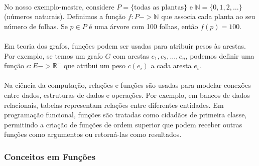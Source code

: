 \documentclass[12pt,a4paper]{article}
\def\to{->}%
\begin{document}
\paragraph{}
No nosso exemplo-mestre, considere \(P=\{\text{todas as plantas}\}\) e \(\mathbb{N}=\{0,1,2,\ldots\}\) (números naturais). Definimos a função \(f: P \to \mathbb{N}\) que associa cada planta ao seu número de folhas. Se \(p \in P\) é uma árvore com 100 folhas, então \(f(p) = 100\).

\paragraph{}
Em teoria dos grafos, funções podem ser usadas para atribuir pesos às arestas. Por exemplo, se temos um grafo \(G\) com arestas \(e_1, e_2, \ldots, e_n\), podemos definir uma função \(c: E \to \mathbb{R}^+\) que atribui um peso \(c(e_i)\) a cada aresta \(e_i\).

\paragraph{}
Na ciência da computação, relações e funções são usadas para modelar conexões entre dados, estruturas de dados e operações. Por exemplo, em bancos de dados relacionais, tabelas representam relações entre diferentes entidades. Em programação funcional, funções são tratadas como cidadãos de primeira classe, permitindo a criação de funções de ordem superior que podem receber outras funções como argumentos ou retorná-las como resultados.

\subsubsection{Conceitos em Funções}
\end{document}

